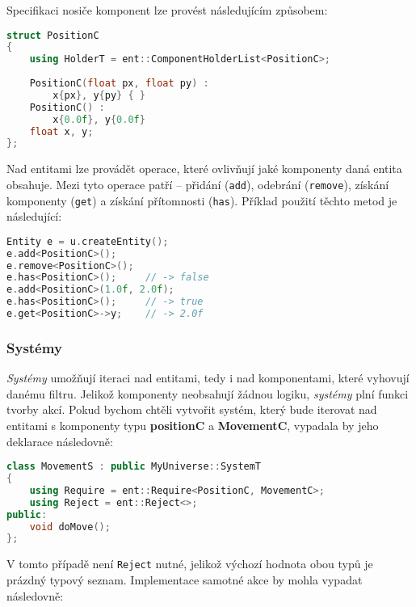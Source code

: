 \noindent Specifikaci nosiče komponent lze provést následujícím způsobem:

\begin{lstlisting}[backgroundcolor = \color{lightgray}, language = C++, xleftmargin = 2cm, framexleftmargin = 1em, tabsize=4]
struct PositionC
{
	using HolderT = ent::ComponentHolderList<PositionC>;
	
	PositionC(float px, float py) :
		x{px}, y{py} { }
	PositionC() : 
		x{0.0f}, y{0.0f}
	float x, y;
};
\end{lstlisting}

Nad entitami lze provádět operace, které ovlivňují jaké komponenty daná entita obsahuje. Mezi tyto operace patří -- přidání (\texttt{add}), odebrání (\texttt{remove}), získání komponenty (\texttt{get}) a získání přítomnosti (\texttt{has}). Příklad použití těchto metod je následující:

\begin{lstlisting}[backgroundcolor = \color{lightgray}, language = C++, xleftmargin = 2cm, framexleftmargin = 1em, tabsize=4]
Entity e = u.createEntity();
e.add<PositionC>();
e.remove<PositionC>();
e.has<PositionC>();		// -> false
e.add<PositionC>(1.0f, 2.0f);
e.has<PositionC>();		// -> true
e.get<PositionC>->y;	// -> 2.0f
\end{lstlisting}

\subsubsection*{Systémy}

\emph{Systémy} umožňují iteraci nad entitami, tedy i nad komponentami, které vyhovují danému filtru. Jelikož komponenty neobsahují žádnou logiku, \emph{systémy} plní funkci tvorby akcí. Pokud bychom chtěli vytvořit systém, který bude iterovat nad entitami s komponenty typu \textbf{positionC} a \textbf{MovementC}, vypadala by jeho deklarace následovně:

\begin{lstlisting}[backgroundcolor = \color{lightgray}, language = C++, xleftmargin = 2cm, framexleftmargin = 1em, tabsize=4]
class MovementS : public MyUniverse::SystemT
{
	using Require = ent::Require<PositionC, MovementC>;
	using Reject = ent::Reject<>;
public:
	void doMove();
};
\end{lstlisting}

\noindent V tomto případě není \texttt{Reject} nutné, jelikož výchozí hodnota obou typů je prázdný typový seznam. Implementace samotné akce by mohla vypadat následovně:

